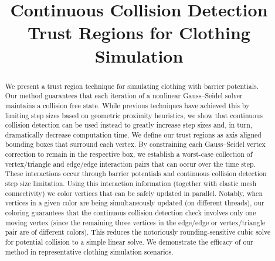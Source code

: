 \documentclass[acmtog,anonymous,review]{acmart}
\title{Continuous Collision Detection Trust Regions for Clothing Simulation}
\begin{document}
\begin{abstract}
We present a trust region technique for simulating clothing with barrier potentials.
Our method guarantees that each iteration of a nonlinear Gauss--Seidel solver maintains a collision free state.
While previous techniques have achieved this by limiting step sizes based on geometric proximity heuristics, we show that continuous collision detection can be used instead to greatly increase step sizes and, in turn, dramatically decrease computation time.
We define our trust regions as axis aligned bounding boxes that surround each vertex. By constraining each Gauss--Seidel vertex correction to remain in the respective box, we establish a worst-case collection of vertex/triangle and edge/edge interaction pairs that can occur over the time step.
These interactions occur through barrier potentials and continuous collision detection step size limitation.
Using this interaction information (together with elastic mesh connectivity) we color vertices that can be safely updated in parallel.
Notably, when vertices in a given color are being simultaneously updated (on different threads), our coloring guarantees that the continuous collision detection check involves only one moving vertex (since the remaining three vertices in the edge/edge or vertex/triangle pair are of different colors).
This reduces the notoriously rounding-sensitive cubic solve for potential collision to a simple linear solve.
We demonstrate the efficacy of our method in representative clothing simulation scenarios.
\end{abstract}

\maketitle
\end{document}
